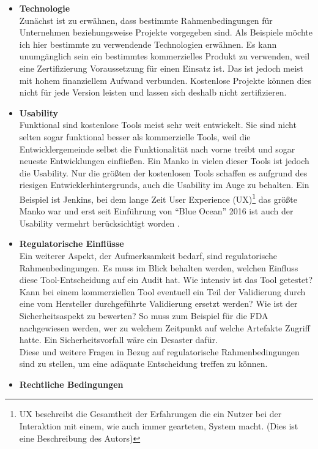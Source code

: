 \begin{itemize}
	\item \textbf{Technologie}\\
	Zunächst ist zu erwähnen, dass bestimmte Rahmenbedingungen für Unternehmen beziehungsweise Projekte vorgegeben sind. Als Beispiele möchte ich hier bestimmte zu verwendende Technologien erwähnen. Es kann unumgänglich sein ein bestimmtes kommerzielles Produkt zu verwenden, weil eine Zertifizierung Voraussetzung für einen Einsatz ist. Das ist jedoch meist mit hohem finanziellem Aufwand verbunden. Kostenlose Projekte können dies nicht für jede Version leisten und lassen sich deshalb nicht zertifizieren.
	\item \textbf{Usability}\\
	Funktional sind kostenlose Tools meist sehr weit entwickelt. Sie sind nicht selten sogar funktional besser als kommerzielle Tools, weil die Entwicklergemeinde selbst die Funktionalität nach vorne treibt und sogar neueste Entwicklungen einfließen. Ein Manko in vielen dieser Tools ist jedoch die Usability. Nur die größten der kostenlosen Tools schaffen es aufgrund des riesigen Entwicklerhintergrunds, auch die Usability im Auge zu behalten. Ein Beispiel ist Jenkins, bei dem lange Zeit User Experience (UX)\footnote{UX beschreibt die Gesamtheit der Erfahrungen die ein Nutzer bei der Interaktion mit einem, wie auch immer gearteten, System macht. (Dies ist eine Beschreibung des Autors)} das größte Manko war und erst seit Einführung von "`Blue Ocean"' 2016 ist auch der Usability vermehrt berücksichtigt worden \cite{Jenkins-UX}.
	\item \textbf{Regulatorische Einflüsse}\\
	Ein weiterer Aspekt, der Aufmerksamkeit bedarf, sind regulatorische Rahmenbedingungen. Es muss im Blick behalten werden, welchen Einfluss diese Tool-Entscheidung auf ein Audit hat. Wie intensiv ist das Tool getestet? Kann bei einem kommerziellen Tool eventuell ein Teil der Validierung durch eine vom Hersteller durchgeführte Validierung ersetzt werden? Wie ist der Sicherheitsaspekt zu bewerten? So muss zum Beispiel für die FDA nachgewiesen werden, wer zu welchem Zeitpunkt auf welche Artefakte Zugriff hatte. Ein Sicherheitsvorfall wäre ein Desaster dafür.\\
	Diese und weitere Fragen in Bezug auf regulatorische Rahmenbedingungen sind zu stellen, um eine adäquate Entscheidung treffen zu können.
	\item \textbf{Rechtliche Bedingungen}\\

\end{itemize}
